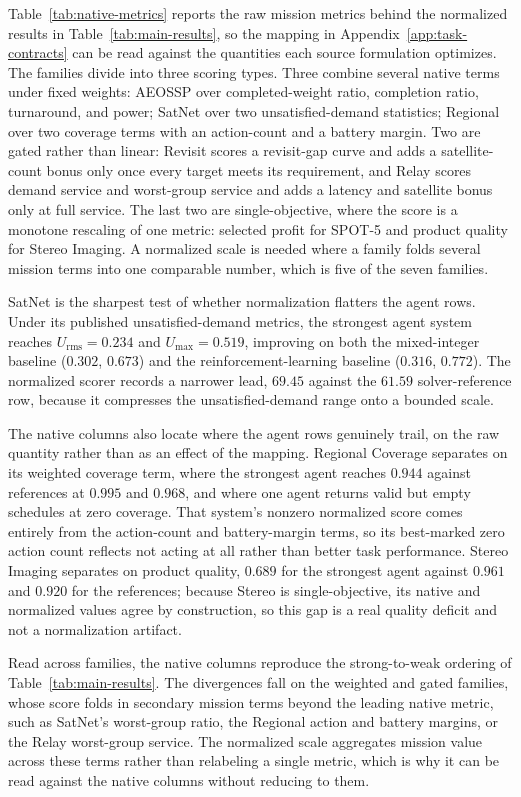 \documentclass[]{mosi}
\begin{document}
Table~\ref{tab:native-metrics} reports the raw mission metrics behind the normalized results in Table~\ref{tab:main-results}, so the mapping in Appendix~\ref{app:task-contracts} can be read against the quantities each source formulation optimizes. The families divide into three scoring types. Three combine several native terms under fixed weights: AEOSSP over completed-weight ratio, completion ratio, turnaround, and power; SatNet over two unsatisfied-demand statistics; Regional over two coverage terms with an action-count and a battery margin. Two are gated rather than linear: Revisit scores a revisit-gap curve and adds a satellite-count bonus only once every target meets its requirement, and Relay scores demand service and worst-group service and adds a latency and satellite bonus only at full service. The last two are single-objective, where the score is a monotone rescaling of one metric: selected profit for SPOT-5 and product quality for Stereo Imaging. A normalized scale is needed where a family folds several mission terms into one comparable number, which is five of the seven families.

SatNet is the sharpest test of whether normalization flatters the agent rows. Under its published unsatisfied-demand metrics, the strongest agent system reaches $U_{\mathrm{rms}}=0.234$ and $U_{\max}=0.519$, improving on both the mixed-integer baseline ($0.302$, $0.673$) and the reinforcement-learning baseline ($0.316$, $0.772$). The normalized scorer records a narrower lead, $69.45$ against the $61.59$ solver-reference row, because it compresses the unsatisfied-demand range onto a bounded scale.

The native columns also locate where the agent rows genuinely trail, on the raw quantity rather than as an effect of the mapping. Regional Coverage separates on its weighted coverage term, where the strongest agent reaches $0.944$ against references at $0.995$ and $0.968$, and where one agent returns valid but empty schedules at zero coverage. That system's nonzero normalized score comes entirely from the action-count and battery-margin terms, so its best-marked zero action count reflects not acting at all rather than better task performance. Stereo Imaging separates on product quality, $0.689$ for the strongest agent against $0.961$ and $0.920$ for the references; because Stereo is single-objective, its native and normalized values agree by construction, so this gap is a real quality deficit and not a normalization artifact.

Read across families, the native columns reproduce the strong-to-weak ordering of Table~\ref{tab:main-results}. The divergences fall on the weighted and gated families, whose score folds in secondary mission terms beyond the leading native metric, such as SatNet's worst-group ratio, the Regional action and battery margins, or the Relay worst-group service. The normalized scale aggregates mission value across these terms rather than relabeling a single metric, which is why it can be read against the native columns without reducing to them.
\end{document}
